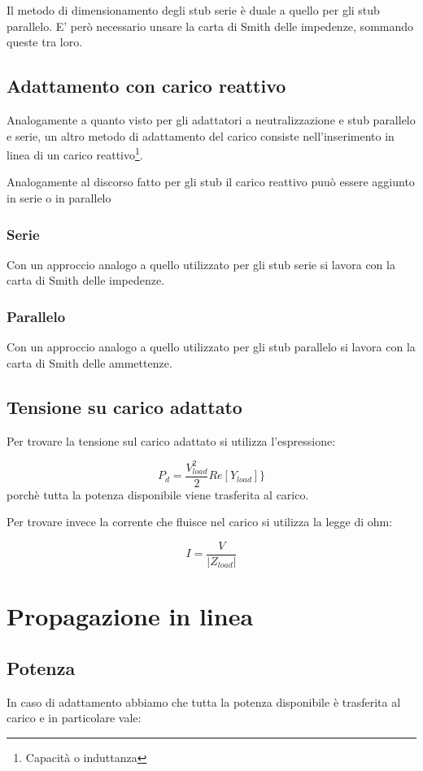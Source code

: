 \documentclass[10pt,a4paper]{report}
\begin{document}
	 	Il metodo di dimensionamento degli stub serie è duale a quello per gli stub parallelo. E' però necessario unsare la carta di Smith delle impedenze, sommando queste tra loro.

		
	\section{Adattamento con carico reattivo}

		Analogamente a quanto visto per gli adattatori a neutralizzazione e stub parallelo e serie, un altro metodo di adattamento del carico consiste nell'inserimento in linea di un carico reattivo\footnote{Capacità o induttanza}.

		Analogamente al discorso fatto per gli stub il carico reattivo puuò essere aggiunto in serie o in parallelo

		\subsection{Serie}
			Con un approccio analogo a quello utilizzato per gli stub serie si lavora con la carta di Smith delle impedenze.
		\subsection{Parallelo}
					Con un approccio analogo a quello utilizzato per gli stub parallelo si lavora con la carta di Smith delle ammettenze.

	\section{Tensione su carico adattato}

	Per trovare la tensione sul carico adattato si utilizza l'espressione:

	\[
	P_d= \frac {V_{load}^2}{2} Re[ Y_{load}] \}
	\]
	porchè tutta la potenza disponibile viene trasferita al carico.

	Per trovare invece la corrente che fluisce nel carico si utilizza la legge di ohm:

	\[
	I=\frac{V}{|Z_{load}|}
	\]



\chapter{Propagazione in linea}



	\section{Potenza}
		In caso di adattamento abbiamo che tutta la potenza disponibile è trasferita al carico e in particolare vale:
			
\end{document}
